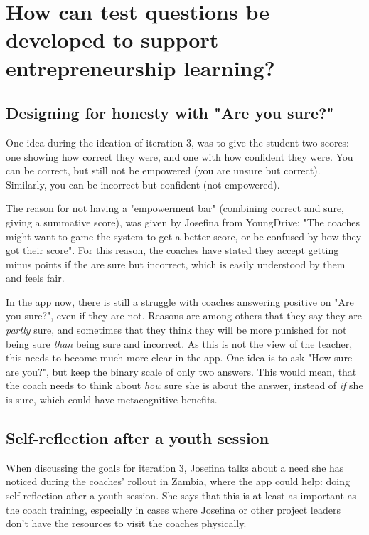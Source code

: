 \section{How can test questions be developed to support entrepreneurship learning?}

\subsection{Designing for honesty with "Are you sure?"}


One idea during the ideation of iteration 3, was to give the student two scores: one showing how correct they were, and one with how confident they were. You can be correct, but still not be empowered (you are unsure but correct). Similarly, you can be incorrect but confident (not empowered).

The reason for not having a "empowerment bar" (combining correct and sure, giving a summative score), was given by Josefina from YoungDrive: "The coaches might want to game the system to get a better score, or be confused by how they got their score". For this reason, the coaches have stated they accept getting minus points if the are sure but incorrect, which is easily understood by them and feels fair.

In the app now, there is still a struggle with coaches answering positive on "Are you sure?", even if they are not. Reasons are among others that they say they are \textit{partly} sure, and sometimes that they think they will be more punished for not being sure \textit{than} being sure and incorrect. As this is not the view of the teacher, this needs to become much more clear in the app. One idea is to ask "How sure are you?", but keep the binary scale of only two answers. This would mean, that the coach needs to think about \textit{how} sure she is about the answer, instead of \textit{if} she is sure, which could have metacognitive benefits.

\subsection{Self-reflection after a youth session}
When discussing the goals for iteration 3, Josefina talks about a need she has noticed during the coaches' rollout in Zambia, where the app could help: doing self-reflection after a youth session. She says that this is at least as important as the coach training, especially in cases where Josefina or other project leaders don't have the resources to visit the coaches physically.

